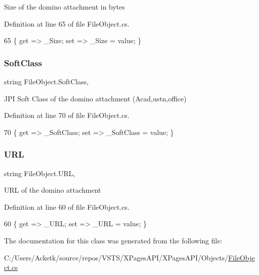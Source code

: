 Size of the domino attachment in bytes 



Definition at line 65 of file File\+Object.\+cs.


\begin{DoxyCode}
65 \{ \textcolor{keyword}{get} => \_Size; \textcolor{keyword}{set} => \_Size = value; \}
\end{DoxyCode}
\mbox{\label{class_file_object_a5e9b8f083b53ea0450a0560c16292a2f}} 
\subsubsection{\texorpdfstring{Soft\+Class}{SoftClass}}
{\footnotesize\ttfamily string File\+Object.\+Soft\+Class\hspace{0.3cm}{\ttfamily [get]}, {\ttfamily [set]}}



J\+PI Soft Class of the domino attachment (Acad,ustn,office) 



Definition at line 70 of file File\+Object.\+cs.


\begin{DoxyCode}
70 \{ \textcolor{keyword}{get} => \_SoftClass; \textcolor{keyword}{set} => \_SoftClass = value; \}
\end{DoxyCode}
\mbox{\label{class_file_object_a7355eaeea3fe40bd8862d7f1f9b479da}} 
\subsubsection{\texorpdfstring{U\+RL}{URL}}
{\footnotesize\ttfamily string File\+Object.\+U\+RL\hspace{0.3cm}{\ttfamily [get]}, {\ttfamily [set]}}



U\+RL of the domino attachment 



Definition at line 60 of file File\+Object.\+cs.


\begin{DoxyCode}
60 \{ \textcolor{keyword}{get} => \_URL; \textcolor{keyword}{set} => \_URL = value; \}
\end{DoxyCode}


The documentation for this class was generated from the following file\+:\begin{DoxyCompactItemize}
\item 
C\+:/\+Users/\+Acketk/source/repos/\+V\+S\+T\+S/\+X\+Pages\+A\+P\+I/\+X\+Pages\+A\+P\+I/\+Objects/\mbox{\hyperlink{_file_object_8cs}{File\+Object.\+cs}}\end{DoxyCompactItemize}

